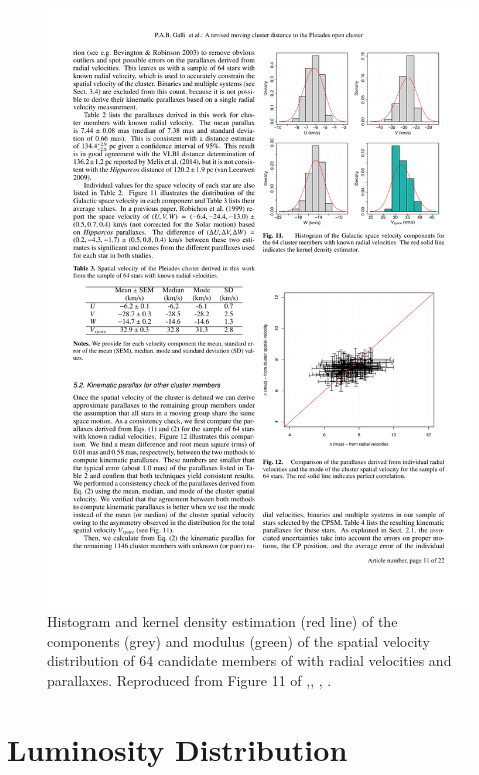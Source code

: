 \begin{figure}[ht!]
\begin{center}
\includegraphics[width=\textwidth]{background/Figures/F11_Galli2017.pdf}
\caption{Histogram and kernel density estimation (red line) of the components (grey) and modulus (green) of the spatial velocity distribution of 64 candidate members of \citet{Galli2017} with radial velocities and parallaxes. Reproduced from Figure 11 of \citet{Galli2017},\textit{}, , .}
\label{fig:velocityGalli}
\end{center}
\end{figure}

\section{Luminosity Distribution}

